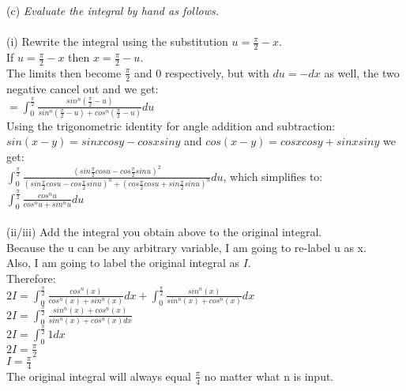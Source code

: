\documentclass[11pt, oneside]{article}   	%
\begin{document}
\noindent (c) \textit{Evaluate the integral by hand as follows.}\\~\\
(i) Rewrite the integral using the substitution $u = \frac{\pi}{2} - x$.\\
If $u = \frac{\pi}{2} - x$ then $x = \frac{\pi}{2} - u$.\\
The limits then become $\frac{\pi}{2}$ and 0 respectively, but with $du = -dx$ as well, the two negative cancel out and we get:\\
$= \int_0^{\frac{\pi}{2}} \frac{sin^n(\frac{\pi}{2} - u)}{sin^n(\frac{\pi}{2} - u) + cos^n(\frac{\pi}{2} - u)} du$\\
Using the trigonometric identity for angle addition and subtraction:\\
$sin(x-y) = sinxcosy - cosxsiny$ and $cos(x-y) = cosxcosy + sinxsiny$ we get:\\
$\int_0^{\frac{\pi}{2}} \frac{(sin\frac{\pi}{2}cosu - cos\frac{\pi}{2}sinu)^2}{(sin\frac{\pi}{2}cosu - cos\frac{\pi}{2}sinu)^n + (cos\frac{\pi}{2}cosu + sin\frac{\pi}{2}sinu)^n}du$, which simplifies to:\\
$\int_0^{\frac{\pi}{2}} \frac{cos^nu}{cos^nu + sin^nu}du$\\~\\
(ii/iii) Add the integral you obtain above to the original integral.\\
Because the u can be any arbitrary variable, I am going to re-label u as x.\\
Also, I am going to label the original integral as $I$.\\
Therefore:\\
$2I = \int_0^{\frac{\pi}{2}} \frac{cos^n(x)}{cos^n(x)+sin^n(x)} dx + \int_0^{\frac{\pi}{2}} \frac{sin^n(x)}{sin^n(x) + cos^n(x)}dx$\\
$2I = \int_0^{\frac{\pi}{2}} \frac{sin^n(x) + cos^n(x)}{sin^n(x) + cos^n(x)dx}$\\
$2I = \int_0^{\frac{\pi}{2}} 1 dx$\\
$2I = \frac{\pi}{2}$\\
$I = \frac{\pi}{4}$\\
The original integral will always equal $\frac{\pi}{4}$ no matter what n is input.
\end{document}

